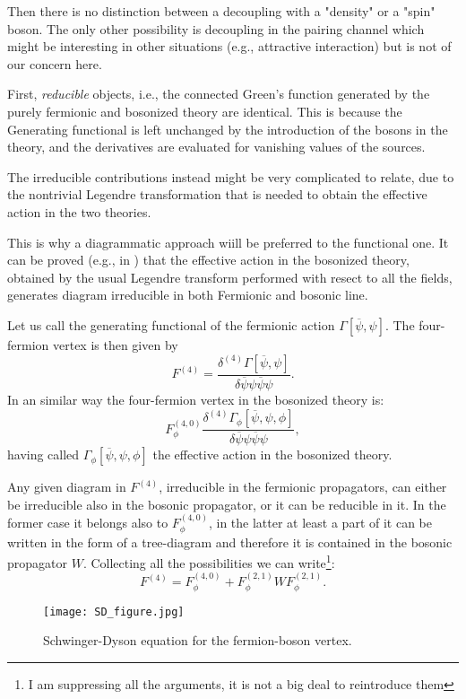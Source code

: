 \documentclass[a4paper,11pt]{article}
\begin{document}
Then there is no distinction between a decoupling with a "density" or a "spin" boson. 
The only other possibility is decoupling in the pairing channel which might be interesting in other situations (e.g., attractive interaction) but is not of our concern here.


First,  {\sl reducible} objects, i.e., the connected Green's function generated by the purely fermionic and bosonized theory are identical. 
This is because the Generating functional \cite{Negele1998} is left unchanged by the introduction of the bosons in the theory, and the derivatives are evaluated for vanishing values of the sources. 

The irreducible contributions instead might be very complicated to relate, due to the nontrivial Legendre transformation that is needed to obtain the effective action in the two theories. 

This is why a diagrammatic approach wiill be preferred to the functional one. 
It can be proved (e.g., in \cite{Schuetz2004}) that the effective action in the bosonized theory, obtained by the usual Legendre transform performed with resect to all the fields, generates diagram irreducible in both Fermionic and bosonic line. 

Let us call the generating functional of the fermionic action $\Gamma[\overline \psi, \psi]$. 
The four-fermion vertex is then given by 
\begin{equation}
F^{(4)}=\frac{\delta ^{(4)} \Gamma[\overline\psi, \psi]}{\delta\overline \psi \psi\overline \psi \psi }.
\end{equation} 
In an similar way the four-fermion vertex in the bosonized theory is: 
\begin{equation}
F_\phi^{(4,0)}\frac{\delta ^{(4)} \Gamma_\phi[\overline\psi, \psi,\phi]}{\delta\overline \psi \psi\overline \psi \psi },
\end{equation} 
having called  $\Gamma_\phi[\overline\psi,\psi,\phi]$ the effective action in the bosonized theory. 

Any given diagram in $F^{(4)}$, irreducible in the fermionic propagators, can either be irreducible also in the bosonic propagator, or it can be reducible in it. In the former case it belongs also to $F^{(4,0)}_\phi$, in the latter at least a part of it can be written in the form of a tree-diagram and therefore it is contained in the bosonic propagator $W$. 
Collecting all the possibilities we can write\footnote{I am suppressing all the arguments, it is not a big deal to reintroduce them}: 
\begin{equation}
\label{connection_without_SD}
F^{(4)}=F^{(4,0)}_\phi+F_\phi^{(2,1)} W F_\phi^{(2,1)}.
\end{equation}  
\begin{figure}
\texttt{[image: SD\_figure.jpg]}
\caption{Schwinger-Dyson equation for the fermion-boson vertex. } \label{SD_figure}

\end{figure}
\end{document}
